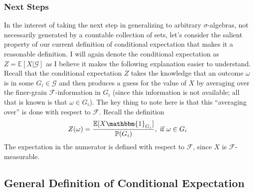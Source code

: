 \documentclass[12pt]{article}
\newcommand{\E}{\mathbb{E}}
\newcommand{\Prob}{\mathbb{P}}
\begin{document}
\subsubsection{Next Steps}
In the interest of taking the next step in generalizing to arbitrary $\sigma$-algebras, not necessarily generated by a countable collection of sets, let's consider the salient property of our current definition of conditional expectation 
that makes it a reasonable definition. I will again denote the conditional expectation as $Z = \E[X|\mathcal{G}]$ as I believe it makes the following explanation easier to understand. Recall that the conditional expectation $Z$ 
takes the knowledge that an outcome $\omega$ is in some $G_i \in \mathcal{G}$ and then produces a guess for the value of $X$ by averaging over the finer-grain $\mathcal{F}$-information in $G_i$ (since this information is not 
available; all that is known is that $\omega \in G_i$). The key thing to note here is that this ``averaging over'' is done with respect to $\mathcal{F}$. Recall the definition 
\[Z(\omega) = \frac{\E[X \mathbbm{1}_{G_i}]}{\Prob(G_i)}, \text{ if } \omega \in G_i\]
The expectation in the numerator is defined with respect to $\mathcal{F}$, since $X$ is $\mathcal{F}$-measurable. 

\subsection{General Definition of Conditional Expectation}
\end{document}
